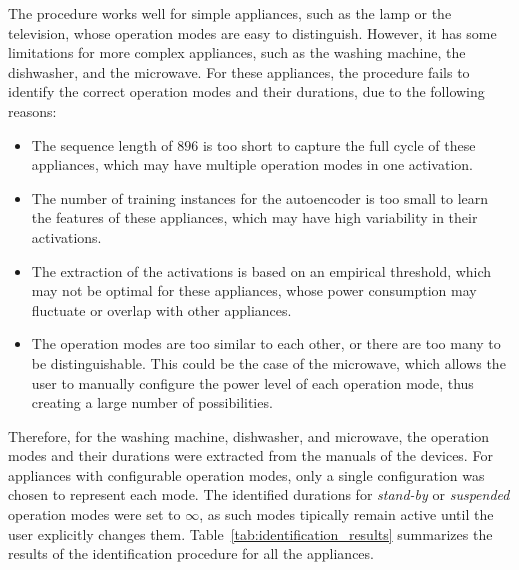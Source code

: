 The procedure works well for simple appliances, such as the lamp or the television, whose operation modes are easy to distinguish. However, it has some limitations for more complex appliances, such as the washing machine, the dishwasher, and the microwave. For these appliances, the procedure fails to identify the correct operation modes and their durations, due to the following reasons:
\begin{itemize}
  \item The sequence length of $896$ is too short to capture the full cycle of these appliances, which may have multiple operation modes in one activation.
  \item The number of training instances for the autoencoder is too small to learn the features of these appliances, which may have high variability in their activations.
  \item The extraction of the activations is based on an empirical threshold, which may not be optimal for these appliances, whose power consumption may fluctuate or overlap with other appliances.
  \item The operation modes are too similar to each other, or there are too many to be distinguishable. This could be the case of the microwave, which allows the user to manually configure the power level of each operation mode, thus creating a large number of possibilities.
\end{itemize}

Therefore, for the washing machine, dishwasher, and microwave, the operation modes and their durations were extracted from the manuals of the devices. For appliances with configurable operation modes, only a single configuration was chosen to represent each mode. The identified durations for \textit{stand-by} or \textit{suspended} operation modes were set to $\infty$, as such modes tipically remain active until the user explicitly changes them. Table~\ref{tab:identification_results} summarizes the results of the identification procedure for all the appliances.

